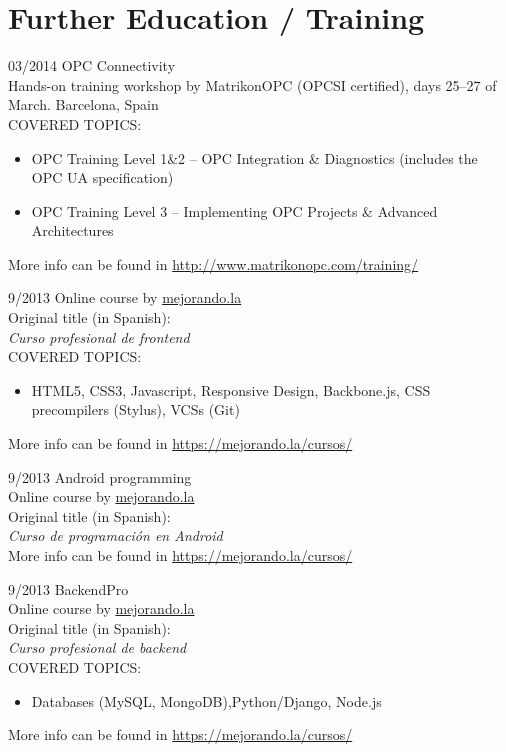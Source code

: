 \documentclass[a4paper]{article}
\begin{document}
\section{Further Education / Training}

\begin{CV}

\item[03/2014] OPC Connectivity\\
Hands-on training workshop by MatrikonOPC (OPCSI certified), days 25--27 of March.
Barcelona, Spain
\vspace{0.2cm}\\COVERED TOPICS:\vspace{0.15cm}
\begin{itemize}
\item OPC Training Level 1\&2 -- OPC Integration \& Diagnostics (includes the OPC UA specification)
\item OPC Training Level 3 -- Implementing OPC Projects \& Advanced Architectures 
\end{itemize}
More info can be found in \url{http://www.matrikonopc.com/training/}

\item[9/2013] Online course by \url{mejorando.la}\\
Original title (in Spanish):\\ \emph{Curso profesional de frontend}
\vspace{0.2cm}\\COVERED TOPICS:\vspace{0.15cm}
\begin{itemize}
\item HTML5, CSS3, Javascript, Responsive Design, Backbone.js, CSS precompilers (Stylus), VCSs (Git)
\end{itemize}
More info can be found in \url{https://mejorando.la/cursos/}

\item[9/2013] Android programming\\
Online course by \url{mejorando.la}\\
Original title (in Spanish):\\ \emph{Curso de programación en Android}\\
More info can be found in \url{https://mejorando.la/cursos/}

\item[9/2013] BackendPro\\
Online course by \url{mejorando.la}\\
Original title (in Spanish):\\ \emph{Curso profesional de backend}
\vspace{0.2cm}\\COVERED TOPICS:\vspace{0.15cm}
\begin{itemize}
\item Databases (MySQL, MongoDB),Python/Django, Node.js
\end{itemize}
More info can be found in \url{https://mejorando.la/cursos/}


\end{CV}
\end{document}
